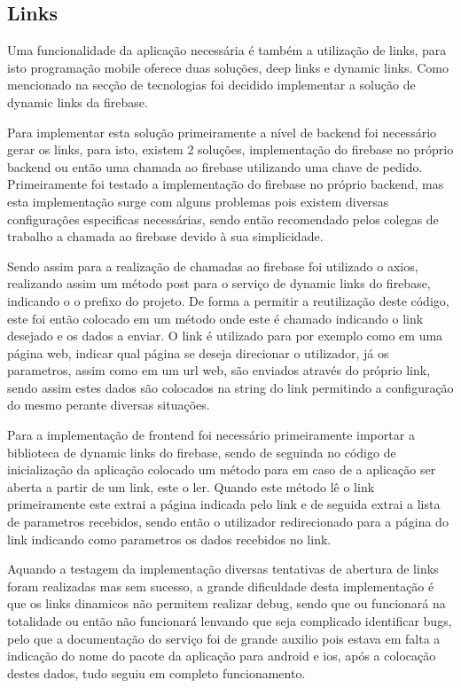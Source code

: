 \subsection{Links}
Uma funcionalidade da aplicação necessária é também a utilização de links, para isto programação mobile oferece duas soluções, deep links e dynamic links. Como mencionado na secção de tecnologias foi decidido implementar a solução de dynamic links da firebase.

Para implementar esta solução primeiramente a nível de backend foi necessário gerar os links, para isto, existem 2 soluções, implementação do firebase no próprio backend ou então uma chamada ao firebase utilizando uma chave de pedido. Primeiramente foi testado a implementação do firebase no próprio backend, mas esta implementação surge com alguns problemas pois existem diversas configurações especificas necessárias, sendo então recomendado pelos colegas de trabalho a chamada ao firebase devido à sua simplicidade.

Sendo assim para a realização de chamadas ao firebase foi utilizado o axios, realizando assim um método post para o serviço de dynamic links do firebase, indicando o o prefixo do projeto. De forma a permitir a reutilização deste código, este foi então colocado em um método onde este é chamado indicando o link desejado e os dados a enviar. O link é utilizado para por exemplo como em uma página web, indicar qual página se deseja direcionar o utilizador, já os parametros, assim como em um url web, são enviados através do próprio link, sendo assim estes dados são colocados na string do link permitindo a configuração do mesmo perante diversas situações.

Para a implementação de frontend foi necessário primeiramente importar a biblioteca de dynamic links do firebase, sendo de seguinda no código de inicialização da aplicação colocado um método para em caso de a aplicação ser aberta a partir de um link, este o ler. Quando este método lê o link primeiramente este extrai a página indicada pelo link e de seguida extrai a lista de parametros recebidos, sendo então o utilizador redirecionado para a página do link indicando como parametros os dados recebidos no link.

Aquando a testagem da implementação diversas tentativas de abertura de links foram realizadas mas sem sucesso, a grande dificuldade desta implementação é que os links dinamicos não permitem realizar debug, sendo que ou funcionará na totalidade ou então não funcionará lenvando que seja complicado identificar bugs, pelo que a documentação do serviço foi de grande auxilio pois estava em falta a indicação do nome do pacote da aplicação para android e ios, após a colocação destes dados, tudo seguiu em completo funcionamento.